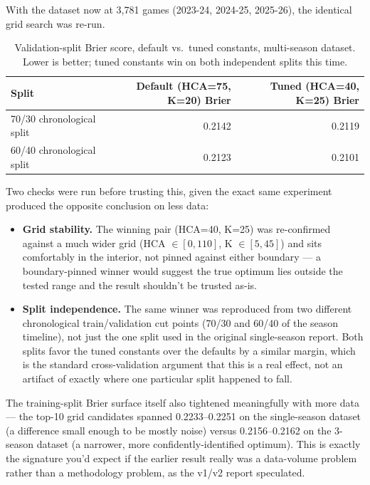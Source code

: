 \documentclass[11pt]{article}
\begin{document}
With the dataset now at 3,781 games (2023-24, 2024-25, 2025-26), the identical grid search was re-run.

\begin{table}[h]
\centering
\begin{tabular}{lrr}
\toprule
Split & Default (HCA=75, K=20) Brier & Tuned (HCA=40, K=25) Brier \\
\midrule
70/30 chronological split & 0.2142 & 0.2119 \\
60/40 chronological split & 0.2123 & 0.2101 \\
\bottomrule
\end{tabular}
\caption{Validation-split Brier score, default vs.\ tuned constants, multi-season dataset. Lower is better;
tuned constants win on both independent splits this time.}
\end{table}

Two checks were run before trusting this, given the exact same experiment produced the opposite conclusion
on less data:

\begin{itemize}
    \item \textbf{Grid stability.} The winning pair (HCA=40, K=25) was re-confirmed against a much wider grid
    (HCA $\in [0, 110]$, K $\in [5, 45]$) and sits comfortably in the interior, not pinned against either
    boundary — a boundary-pinned winner would suggest the true optimum lies outside the tested range and the
    result shouldn't be trusted as-is.
    \item \textbf{Split independence.} The same winner was reproduced from two different chronological
    train/validation cut points (70/30 and 60/40 of the season timeline), not just the one split used in the
    original single-season report. Both splits favor the tuned constants over the defaults by a similar
    margin, which is the standard cross-validation argument that this is a real effect, not an artifact of
    exactly where one particular split happened to fall.
\end{itemize}

The training-split Brier surface itself also tightened meaningfully with more data — the top-10 grid
candidates spanned 0.2233–0.2251 on the single-season dataset (a difference small enough to be mostly noise)
versus 0.2156–0.2162 on the 3-season dataset (a narrower, more confidently-identified optimum). This is
exactly the signature you'd expect if the earlier result really was a data-volume problem rather than a
methodology problem, as the v1/v2 report speculated.
\end{document}

